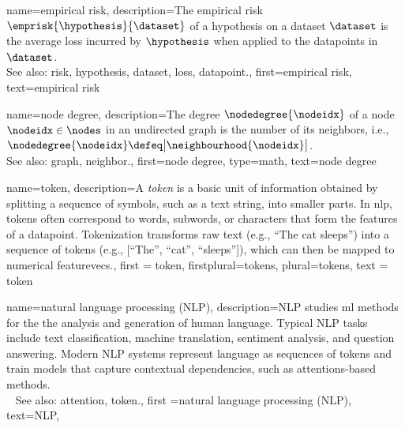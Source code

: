 {name={empirical risk},
  description={The empirical \gls{risk} $\emprisk{\hypothesis}{\dataset}$ 
  	of a \gls{hypothesis} on a \gls{dataset} $\dataset$ is the average \gls{loss} incurred 
  	by $\hypothesis$ when applied to the \glspl{datapoint} in $\dataset$.
				\\ 
		See also: \gls{risk}, \gls{hypothesis}, \gls{dataset}, \gls{loss}, \gls{datapoint}.},
  first={empirical risk},
  text={empirical risk} 
}

{name={node degree},
	description={The degree $\nodedegree{\nodeidx}$ of a 
	node $\nodeidx \in \nodes$ in an undirected \gls{graph} is the 
	number of its \glspl{neighbor}, i.e., $\nodedegree{\nodeidx} \defeq \big|\neighbourhood{\nodeidx}\big|$.
					\\ 
		See also: \gls{graph}, \gls{neighbor}.},
	first={node degree},
	type=math, 
	text={node degree} 
}

{name={token},
 description={A \textit{token} is a basic unit of information 
  obtained by splitting a sequence of symbols, such as a text string, 
  into smaller parts. In \gls{nlp}, tokens often correspond to words, subwords, 
  or characters that form the \glspl{feature} of a \gls{datapoint}. 
  Tokenization transforms raw text (e.g., ``The cat sleeps'') into a 
  sequence of tokens (e.g., [``The'', ``cat'', ``sleeps'']), which can
  then be mapped to numerical \glspl{featurevec}.}, 
  first = {token}, 
  firstplural={tokens}, 
  plural={tokens}, 
  text = {token}
}

{name={natural language processing (NLP)},
 description={NLP  
 studies \gls{ml} methods for the the analysis and generation of human language. 
  Typical NLP tasks include text \gls{classification}, machine translation, 
  sentiment analysis, and question answering. Modern NLP systems represent 
  language as sequences of \glspl{token} and train \glspl{model} that 
  capture contextual dependencies, such as \glspl{attention}-based methods.\\ 
  See also: \gls{attention}, \gls{token}.}, 
first ={natural language processing (NLP)}, 
text={NLP},
}

